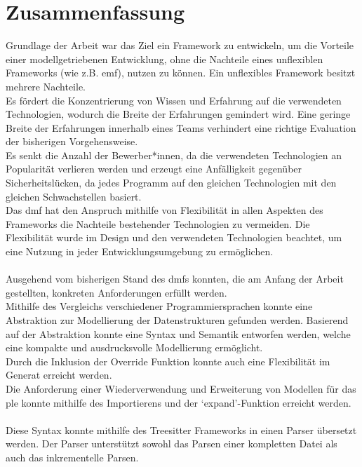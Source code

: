 \documentclass[./einleitung.tex]{subfiles}
\begin{document}
\chapter{Zusammenfassung}\label{ch:zusammenfassung}
Grundlage der Arbeit war das Ziel ein Framework zu entwickeln, um die Vorteile einer modellgetriebenen Entwicklung,
ohne die Nachteile eines unflexiblen Frameworks (wie z.B. \acrshort{emf}), nutzen zu können.
Ein unflexibles Framework besitzt mehrere Nachteile.\\
Es fördert die Konzentrierung von Wissen und Erfahrung auf die verwendeten Technologien, wodurch die Breite der Erfahrungen gemindert wird.
Eine geringe Breite der Erfahrungen innerhalb eines Teams verhindert eine richtige Evaluation der bisherigen Vorgehensweise.\\
Es senkt die Anzahl der Bewerber*innen, da die verwendeten Technologien an Popularität verlieren werden und erzeugt eine Anfälligkeit gegenüber Sicherheitslücken,
da jedes Programm auf den gleichen Technologien mit den gleichen Schwachstellen basiert.\\
Das \acrshort{dmf} hat den Anspruch mithilfe von Flexibilität in allen Aspekten des Frameworks die Nachteile bestehender Technologien zu vermeiden.
Die Flexibilität wurde im Design und den verwendeten Technologien beachtet, um eine Nutzung in jeder Entwicklungsumgebung zu ermöglichen.
\\\\
Ausgehend vom bisherigen Stand des \acrshort{dmf}s konnten, die am Anfang der Arbeit gestellten, konkreten Anforderungen erfüllt werden.\\
Mithilfe des Vergleichs verschiedener Programmiersprachen konnte eine Abstraktion zur Modellierung der Datenstrukturen gefunden werden.
Basierend auf der Abstraktion konnte eine Syntax und Semantik entworfen werden, welche eine kompakte und ausdrucksvolle Modellierung ermöglicht.\\
Durch die Inklusion der Override Funktion konnte auch eine Flexibilität im Generat erreicht werden.\\
Die Anforderung einer Wiederverwendung und Erweiterung von Modellen für das \acrshort{ple} konnte mithilfe des Importierens und der `expand'-Funktion erreicht werden.
\\\\
Diese Syntax konnte mithilfe des Treesitter Frameworks in einen Parser übersetzt werden.
Der Parser unterstützt sowohl das Parsen einer kompletten Datei als auch das inkrementelle Parsen.\\
\end{document}
